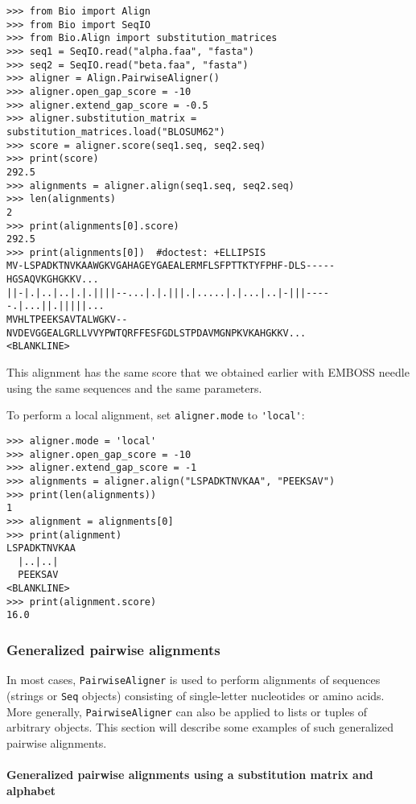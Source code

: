 \begin{verbatim}
>>> from Bio import Align
>>> from Bio import SeqIO
>>> from Bio.Align import substitution_matrices
>>> seq1 = SeqIO.read("alpha.faa", "fasta")
>>> seq2 = SeqIO.read("beta.faa", "fasta")
>>> aligner = Align.PairwiseAligner()
>>> aligner.open_gap_score = -10
>>> aligner.extend_gap_score = -0.5
>>> aligner.substitution_matrix = substitution_matrices.load("BLOSUM62")
>>> score = aligner.score(seq1.seq, seq2.seq)
>>> print(score)
292.5
>>> alignments = aligner.align(seq1.seq, seq2.seq)
>>> len(alignments)
2
>>> print(alignments[0].score)
292.5
>>> print(alignments[0])  #doctest: +ELLIPSIS
MV-LSPADKTNVKAAWGKVGAHAGEYGAEALERMFLSFPTTKTYFPHF-DLS-----HGSAQVKGHGKKV...
||-|.|..|..|.|.||||--...|.|.|||.|.....|.|...|..|-|||-----.|...||.|||||...
MVHLTPEEKSAVTALWGKV--NVDEVGGEALGRLLVVYPWTQRFFESFGDLSTPDAVMGNPKVKAHGKKV...
<BLANKLINE>
\end{verbatim}

This alignment has the same score that we obtained earlier with EMBOSS needle
using the same sequences and the same parameters.

To perform a local alignment, set \verb+aligner.mode+ to \verb+'local'+:

\begin{verbatim}
>>> aligner.mode = 'local'
>>> aligner.open_gap_score = -10
>>> aligner.extend_gap_score = -1
>>> alignments = aligner.align("LSPADKTNVKAA", "PEEKSAV")
>>> print(len(alignments))
1
>>> alignment = alignments[0]
>>> print(alignment)
LSPADKTNVKAA
  |..|..|   
  PEEKSAV   
<BLANKLINE>
>>> print(alignment.score)
16.0
\end{verbatim}

\subsubsection{Generalized pairwise alignments}
\label{sec:generalized-pairwise}

In most cases, \verb+PairwiseAligner+ is used to perform alignments of sequences (strings or \verb+Seq+ objects) consisting of single-letter nucleotides or amino acids. More generally, \verb+PairwiseAligner+ can also be applied to lists or tuples of arbitrary objects. This section will describe some examples of such generalized pairwise alignments.

\paragraph*{Generalized pairwise alignments using a substitution matrix and alphabet}

